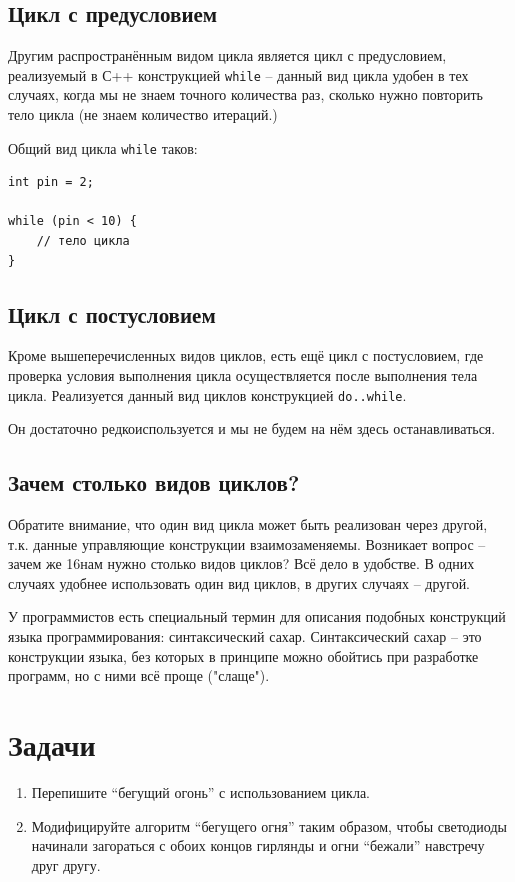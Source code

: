 \documentclass[a4paper,twoside]{book}
\begin{document}
\subsection{Цикл с предусловием}

Другим распространённым видом цикла является цикл с предусловием, реализуемый в
С++ конструкцией \texttt{while} -- данный вид цикла удобен в тех случаях, когда
мы не знаем точного количества раз, сколько нужно повторить тело цикла (не знаем
количество итераций.)

Общий вид цикла \texttt{while} таков:
\begin{verbatim}
int pin = 2;

while (pin < 10) {
    // тело цикла
}
\end{verbatim}

\subsection{Цикл с постусловием}

Кроме вышеперечисленных видов циклов, есть ещё цикл с постусловием, где
проверка условия выполнения цикла осуществляется после выполнения тела цикла.
Реализуется данный вид циклов конструкцией \texttt{do..while}.

Он достаточно редкоиспользуется и мы не будем на нём здесь останавливаться.

\subsection{Зачем столько видов циклов?}

Обратите внимание, что один вид цикла может быть реализован через другой, т.к.
данные управляющие конструкции взаимозаменяемы. Возникает вопрос -- зачем же
16нам нужно столько видов циклов? Всё дело в удобстве. В одних случаях удобнее
использовать один вид циклов, в других случаях -- другой.

У программистов есть специальный термин для описания подобных конструкций языка
программирования: синтаксический сахар. Синтаксический сахар -- это конструкции
языка, без которых в принципе можно обойтись при разработке программ, но с ними
всё проще ("слаще").

\section{Задачи}
\begin{enumerate}
\item Перепишите ``бегущий огонь'' с использованием цикла.
\item Модифицируйте алгоритм ``бегущего огня'' таким образом, чтобы светодиоды
  начинали загораться с обоих концов гирлянды и огни ``бежали'' навстречу друг
  другу.
\end{enumerate}
\end{document}
